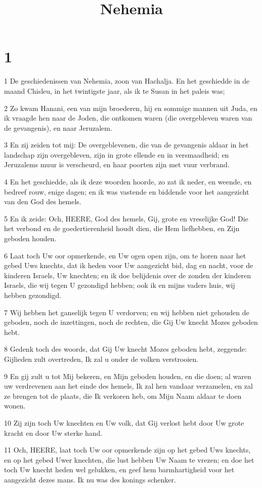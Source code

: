 

\title{Nehemia}



\chapter{1}

\par 1 De geschiedenissen van Nehemia, zoon van Hachalja. En het geschiedde in de maand Chisleu, in het twintigste jaar, als ik te Susan in het paleis was;
\par 2 Zo kwam Hanani, een van mijn broederen, hij en sommige mannen uit Juda, en ik vraagde hen naar de Joden, die ontkomen waren (die overgebleven waren van de gevangenis), en naar Jeruzalem.
\par 3 En zij zeiden tot mij: De overgeblevenen, die van de gevangenis aldaar in het landschap zijn overgebleven, zijn in grote ellende en in versmaadheid; en Jeruzalems muur is verscheurd, en haar poorten zijn met vuur verbrand.
\par 4 En het geschiedde, als ik deze woorden hoorde, zo zat ik neder, en weende, en bedreef rouw, enige dagen; en ik was vastende en biddende voor het aangezicht van den God des hemels.
\par 5 En ik zeide: Och, HEERE, God des hemels, Gij, grote en vreselijke God! Die het verbond en de goedertierenheid houdt dien, die Hem liefhebben, en Zijn geboden houden.
\par 6 Laat toch Uw oor opmerkende, en Uw ogen open zijn, om te horen naar het gebed Uws knechts, dat ik heden voor Uw aangezicht bid, dag en nacht, voor de kinderen Israels, Uw knechten; en ik doe belijdenis over de zonden der kinderen Israels, die wij tegen U gezondigd hebben; ook ik en mijns vaders huis, wij hebben gezondigd.
\par 7 Wij hebben het ganselijk tegen U verdorven; en wij hebben niet gehouden de geboden, noch de inzettingen, noch de rechten, die Gij Uw knecht Mozes geboden hebt.
\par 8 Gedenk toch des woords, dat Gij Uw knecht Mozes geboden hebt, zeggende: Gijlieden zult overtreden, Ik zal u onder de volken verstrooien.
\par 9 En gij zult u tot Mij bekeren, en Mijn geboden houden, en die doen; al waren uw verdrevenen aan het einde des hemels, Ik zal hen vandaar verzamelen, en zal ze brengen tot de plaats, die Ik verkoren heb, om Mijn Naam aldaar te doen wonen.
\par 10 Zij zijn toch Uw knechten en Uw volk, dat Gij verlost hebt door Uw grote kracht en door Uw sterke hand.
\par 11 Och, HEERE, laat toch Uw oor opmerkende zijn op het gebed Uws knechts, en op het gebed Uwer knechten, die lust hebben Uw Naam te vrezen; en doe het toch Uw knecht heden wel gelukken, en geef hem barmhartigheid voor het aangezicht dezes mans. Ik nu was des konings schenker.

